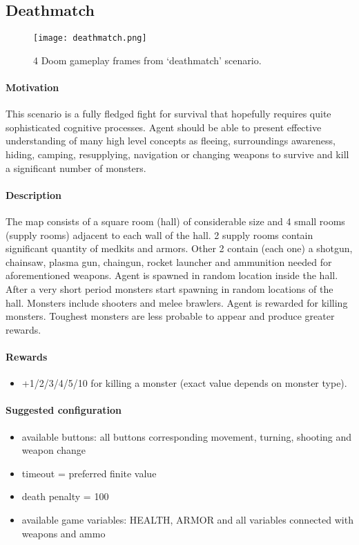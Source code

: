 	\subsection{Deathmatch}
		\begin{figure}
			\centering
			\texttt{[image: deathmatch.png]}
			\caption{4 Doom gameplay frames from `deathmatch' scenario.}\label{fig:deatchmatch}
		\end{figure}
		\paragraph{Motivation} 
	 		This scenario is a fully fledged fight for survival that hopefully requires quite sophisticated cognitive processes. Agent should be able to present effective understanding of many high level concepts as fleeing, surroundings awareness, hiding, camping, resupplying, navigation or changing weapons to survive and kill a significant number of monsters.

		\paragraph{Description}
			The map consists of a square room (hall) of considerable size and 4 small rooms (supply rooms) adjacent to each wall of the hall. 2 supply rooms contain significant quantity of medkits and armors. Other 2 contain (each one) a shotgun, chainsaw, plasma gun, chaingun, rocket launcher and ammunition needed for aforementioned weapons. Agent is spawned in random location inside the hall. After a very short period monsters start spawning in random locations of the hall. Monsters include shooters and melee brawlers. Agent is rewarded for killing monsters. Toughest monsters are less probable to appear and produce greater rewards.
		\paragraph{Rewards}
			\begin{itemize}
				\item +1/2/3/4/5/10 for killing a monster (exact value depends on monster type).
			\end{itemize}
		
		\paragraph{Suggested configuration}
			\begin{itemize}
				\item available buttons: all buttons corresponding movement, turning, shooting and weapon change 
				\item timeout = preferred finite value
				\item death penalty = 100
				\item available game variables: HEALTH, ARMOR and all variables connected with weapons and ammo
			\end{itemize}		
	\newpage

